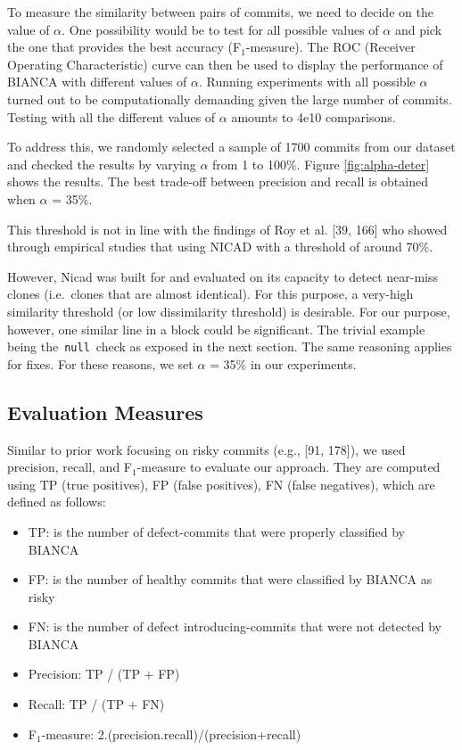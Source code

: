 \documentclass[12pt]{report}
\providecommand{\tightlist}{%
  \setlength{\itemsep}{0pt}\setlength{\parskip}{0pt}}
\begin{document}


To measure the similarity between pairs of commits, we need to decide on
the value of \(\alpha\). One possibility would be to test for all
possible values of \(\alpha\) and pick the one that provides the best
accuracy (F\(_1\)-measure). The ROC (Receiver Operating Characteristic)
curve can then be used to display the performance of BIANCA with
different values of \(\alpha\). Running experiments with all possible
\(\alpha\) turned out to be computationally demanding given the large
number of commits. Testing with all the different values of \(\alpha\)
amounts to 4e10 comparisons.

To address this, we randomly selected a sample of 1700 commits from our
dataset and checked the results by varying \(\alpha\) from 1 to 100\%.
Figure \ref{fig:alpha-deter} shows the results. The best trade-off
between precision and recall is obtained when \(\alpha\) = 35\%.

This threshold is not in line with the findings of Roy et al. {[}39,
166{]} who showed through empirical studies that using NICAD with a
threshold of around 70\%.

However, Nicad was built for and evaluated on its capacity to detect
near-miss clones (i.e.~clones that are almost identical). For this
purpose, a very-high similarity threshold (or low dissimilarity
threshold) is desirable. For our purpose, however, one similar line in a
block could be significant. The trivial example being
the~\lstinline!null!~check as exposed in the next section. The same
reasoning applies for fixes. For these reasons, we set \(\alpha\) = 35\%
in our experiments.

\subsection{Evaluation Measures}\label{evaluation-measures}

Similar to prior work focusing on risky commits (e.g., {[}91, 178{]}),
we used precision, recall, and F\(_1\)-measure to evaluate our approach.
They are computed using TP (true positives), FP (false positives), FN
(false negatives), which are defined as follows:

\begin{itemize}
\tightlist
\item
  TP: is the number of defect-commits that were properly classified by
  BIANCA
\item
  FP: is the number of healthy commits that were classified by BIANCA as
  risky
\item
  FN: is the number of defect introducing-commits that were not detected
  by BIANCA
\item
  Precision: TP / (TP + FP)
\item
  Recall: TP / (TP + FN)
\item
  F\(_1\)-measure: 2.(precision.recall)/(precision+recall)
\end{itemize}
\end{document}
